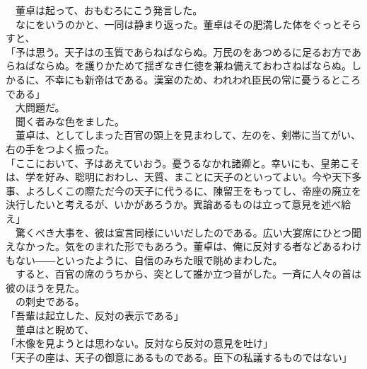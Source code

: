 \documentclass[
  paper=a5,
  fontsize=10pt,
  jafontsize=9.5pt,
  tate,                  %
  open_bracket_pos=nibu, %
]{jlreq}
\begin{document}
　董卓は起って、おもむろにこう発言した。\\


　なにをいうのかと、一同は静まり返った。董卓はその肥満した体をぐっとそらすと、\\


「予は思う。天子はの玉質であらねばならぬ。万民のをあつめるに足るお方であらねばならぬ。を護りかためて揺ぎなき仁徳を兼ね備えておわさねばならぬ。しかるに、不幸にも新帝はである。漢室のため、われわれ臣民の常に憂うるところである」\\


　大問題だ。\\


　聞く者みな色をました。\\


　董卓は、としてしまった百官の頭上を見まわして、左のを、剣帯に当てがい、右の手をつよく振った。\\


「ここにおいて、予はあえていおう。憂うるなかれ諸卿と。幸いにも、皇弟こそは、学を好み、聡明におわし、天質、まことに天子のといってよい。今や天下多事、よろしくこの際ただ今の天子に代うるに、陳留王をもってし、帝座の廃立を決行したいと考えるが、いかがあろうか。異論あるものは立って意見を述べ給え」\\


　驚くべき大事を、彼は宣言同様にいいだしたのである。広い大宴席にひとつ聞えなかった。気をのまれた形でもあろう。董卓は、俺に反対する者などあるわけもない――といったように、自信のみちた眼で眺めまわした。\\


　すると、百官の席のうちから、突として誰か立つ音がした。一斉に人々の首は彼のほうを見た。\\


　の刺史である。\\


「吾輩は起立した、反対の表示である」\\


　董卓はと睨めて、\\


「木像を見ようとは思わない。反対なら反対の意見を吐け」\\


「天子の座は、天子の御意にあるものである。臣下の私議するものではない」\\
\end{document}
